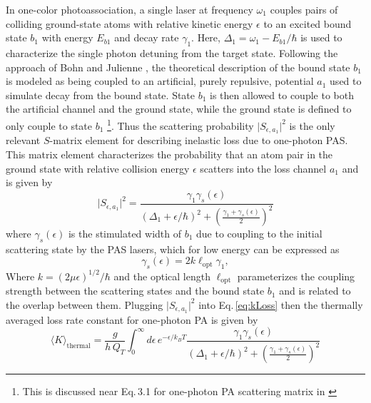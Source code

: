 In one-color photoassociation, a single laser at frequency $\omega_1$ couples pairs of colliding ground-state atoms with relative kinetic energy $\epsilon$ to an excited bound state $b_1$ with energy $E_{b1}$ and decay rate $\gamma_1$.
Here, $\Delta_1 = \omega_1 - E_{b1}/\hbar$ is used to characterize the single photon detuning from the target state.
Following the approach of Bohn and Julienne \cite{Bohn1999}, the theoretical description of the bound state $b_1$ is modeled as being coupled to an artificial, purely repulsive, potential $a_1$ used to simulate decay from the bound state.
State $b_1$ is then allowed to couple to both the artificial channel and the ground state, while the ground state is defined to only couple to state $b_1$ \footnote{This is discussed near Eq.\,3.1 for one-photon PA scattering matrix in \cite{Bohn1999}}.
Thus the scattering probability $\vert S_{\epsilon, a_1} \vert^2$ is the only relevant $S$-matrix element for describing inelastic loss due to one-photon PAS.
This matrix element characterizes the probability that an atom pair in the ground state with relative collision energy $\epsilon$ scatters into the loss channel $a_1$ and is given by
\begin{equation}
	\vert  S_{\epsilon, a_1} \vert^2 = \frac{\gamma_1 \gamma_s(\epsilon)}{(\Delta_1 + \epsilon/ \hbar)^2 + \left( \frac{\gamma_1 + \gamma_s(\epsilon)}{2} \right)^2}
\end{equation}
where ${\gamma}_{s}(\epsilon)$ is the stimulated width of $b_1$ due to coupling to the initial scattering state by the PAS lasers, which for low energy can be expressed as \cite{ctj06,Borkowski2014a,Pachomov2017,Pachomow2017a}
\begin{equation}\label{3equationstimulatedwidth}
	{\gamma}_{s}(\epsilon) = 2 k \ell_{\text{opt}} \gamma_1,
\end{equation}
Where $k=(2\mu \epsilon)^{1/2}/\hbar$ and the optical length $\ell_{\text{opt}}$ parameterizes the coupling strength between the scattering states and the bound state $b_1$ and is related to the overlap between them.
Plugging $\vert S_{\epsilon, a_1} \vert^2$ into Eq.\,\ref{eq:kLoss} then the thermally averaged loss rate constant for one-photon PA is given by
\begin{equation} \label{eq:onePhotonK}
	\langle K \rangle_\text{thermal} = \frac{g}{h\,Q_{T}} \int_{0}^{\infty} d\epsilon \,e^{-\epsilon/k_{B}T} \frac{\gamma_1 \gamma_s(\epsilon)}{(\Delta_1 + \epsilon/ \hbar)^2 + \left( \frac{\gamma_1 + \gamma_s(\epsilon)}{2} \right)^2} 
\end{equation}


